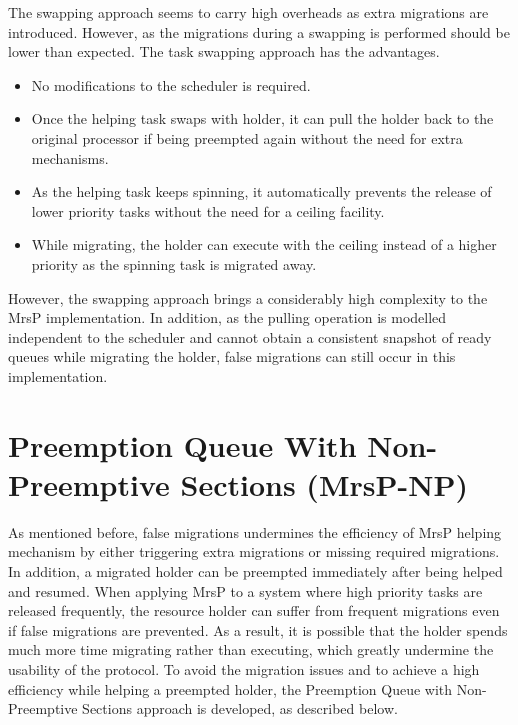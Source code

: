 \documentclass{report}
\begin{document}
The swapping approach seems to carry high overheads as extra migrations are introduced. However, as the migrations during a swapping is performed should be lower than expected. The task swapping approach has the advantages.
\begin{itemize}
\item No modifications to the scheduler is required.
\item Once the helping task swaps with holder, it can pull the holder back to the original processor if being preempted again without the need for extra mechanisms. 
\item As the helping task keeps spinning, it automatically prevents the release of lower priority tasks without the need for a ceiling facility.
\item While migrating, the holder can execute with the ceiling instead of a higher priority as the spinning task is migrated away.
\end{itemize}
However, the swapping approach brings a considerably high complexity to the MrsP implementation. In addition, as the pulling operation is modelled independent to the scheduler and cannot obtain a consistent snapshot of ready queues while migrating the holder, false migrations can still occur in this implementation.

\section{Preemption Queue With Non-Preemptive Sections (MrsP-NP)}
\label{Subsectionpreemptionqueue}
As mentioned before, false migrations undermines the efficiency of MrsP helping mechanism by either triggering extra migrations or missing required migrations. In addition, a migrated holder can be preempted immediately after being helped and resumed. When applying MrsP to a system where high priority tasks are released frequently, the resource holder can suffer from frequent migrations even if false migrations are prevented. As a result, it is possible that the holder spends much more time migrating rather than executing, which greatly undermine the usability of the protocol. To avoid the migration issues and to achieve a high efficiency while helping a preempted holder, the Preemption Queue with Non-Preemptive Sections approach is developed, as described below. 
\end{document}
